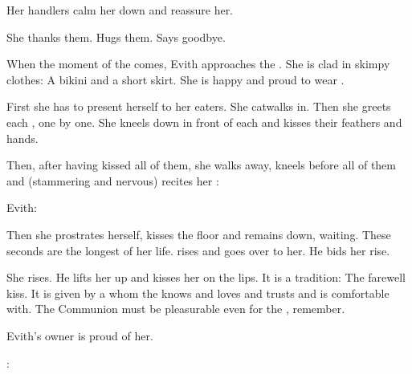 \begin{garbage}
Her handlers calm her down and reassure her. 

\begin{prose}

  She thanks them. 
  Hugs them. 
  Says goodbye. 
\end{prose}

When the moment of the  comes, Evith approaches the \resphain{}. 
She is clad in skimpy clothes: 
A bikini and a short skirt. 
She is happy and proud to wear . 

First she has to present herself to her eaters. 
She catwalks in.
Then she greets each \resphan{}, one by one. 
She kneels down in front of each and kisses their feathers and hands. 

Then, after having kissed all of them, she walks away, kneels before all of them and (stammering and nervous) recites her :

\begin{prose}
  Evith:
\end{prose}

Then she prostrates herself, kisses the floor and remains down, waiting. 
These seconds are the longest of her life. 
\Teshrial{} rises and goes over to her. 
He bids her rise. 

She rises. 
He lifts her up and kisses her on the lips. 
It is a tradition: 
The farewell kiss. 
It is given by a \resphan{} whom the \naor{} knows and loves and trusts and is comfortable with. 
The Communion must be pleasurable even for the \naor, remember. 

Evith's owner is proud of her. 

\begin{prose}
  \Teshrial:
\end{prose}


\end{garbage}
